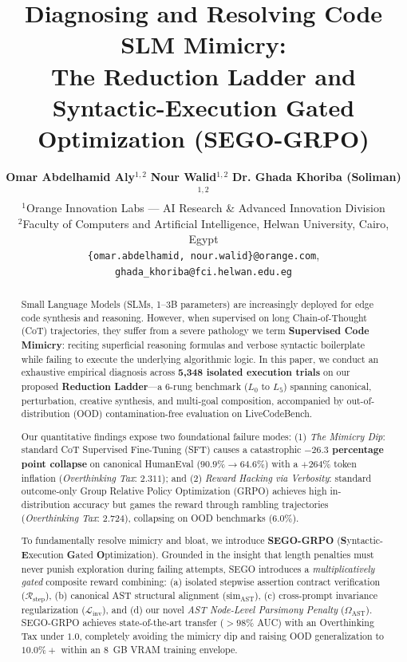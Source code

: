 \documentclass[10pt,twocolumn,letterpaper]{article}
\title{\textbf{\Large Diagnosing and Resolving Code SLM Mimicry:\\The Reduction Ladder and Syntactic-Execution Gated Optimization (SEGO-GRPO)}}
\author{
    \textbf{Omar Abdelhamid Aly}$^{1,2}$ \quad 
    \textbf{Nour Walid}$^{1,2}$ \quad 
    \textbf{Dr. Ghada Khoriba (Soliman)}$^{1,2}$ \\[1.5ex]
    $^{1}$Orange Innovation Labs --- AI Research \& Advanced Innovation Division \\
    $^{2}$Faculty of Computers and Artificial Intelligence, Helwan University, Cairo, Egypt \\
    \texttt{\{omar.abdelhamid, nour.walid\}@orange.com}, \quad \texttt{ghada\_khoriba@fci.helwan.edu.eg}
}
\date{\vspace{-2.5ex}}
\newcommand{\simAST}{\text{sim}_{\text{AST}}}
\newcommand{\OmegaAST}{\Omega_{\text{AST}}}
\newcommand{\Rstep}{\mathcal{R}_{\text{step}}}
\newcommand{\Linv}{\mathcal{L}_{\text{inv}}}
\begin{document}
\maketitle

\begin{abstract}
Small Language Models (SLMs, 1--3B parameters) are increasingly deployed for edge code synthesis and reasoning. However, when supervised on long Chain-of-Thought (CoT) trajectories, they suffer from a severe pathology we term \textbf{Supervised Code Mimicry}: reciting superficial reasoning formulas and verbose syntactic boilerplate while failing to execute the underlying algorithmic logic. In this paper, we conduct an exhaustive empirical diagnosis across \textbf{5,348 isolated execution trials} on our proposed \textbf{Reduction Ladder}---a 6-rung benchmark ($L_0$ to $L_5$) spanning canonical, perturbation, creative synthesis, and multi-goal composition, accompanied by out-of-distribution (OOD) contamination-free evaluation on LiveCodeBench. 

Our quantitative findings expose two foundational failure modes: (1) \textit{The Mimicry Dip}: standard CoT Supervised Fine-Tuning (SFT) causes a catastrophic \textbf{$-26.3$ percentage point collapse} on canonical HumanEval ($90.9\% \rightarrow 64.6\%$) with a $+264\%$ token inflation (\textit{Overthinking Tax}: $2.311$); and (2) \textit{Reward Hacking via Verbosity}: standard outcome-only Group Relative Policy Optimization (GRPO) achieves high in-distribution accuracy but games the reward through rambling trajectories (\textit{Overthinking Tax}: $2.724$), collapsing on OOD benchmarks ($6.0\%$).

To fundamentally resolve mimicry and bloat, we introduce \textbf{SEGO-GRPO} (\textbf{S}yntactic-\textbf{E}xecution \textbf{G}ated \textbf{O}ptimization). Grounded in the insight that length penalties must never punish exploration during failing attempts, SEGO introduces a \textit{multiplicatively gated} composite reward combining: (a) isolated stepwise assertion contract verification ($\Rstep$), (b) canonical AST structural alignment ($\simAST$), (c) cross-prompt invariance regularization ($\Linv$), and (d) our novel \textit{AST Node-Level Parsimony Penalty} ($\OmegaAST$). SEGO-GRPO achieves state-of-the-art transfer ($>98\%$ AUC) with an Overthinking Tax under $1.0$, completely avoiding the mimicry dip and raising OOD generalization to $10.0\%+$ within an 8~GB VRAM training envelope.
\end{abstract}
\end{document}
